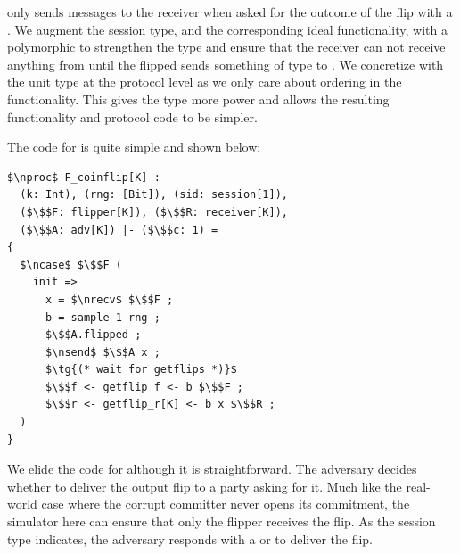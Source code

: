 \Fflip only sends messages to the receiver when asked for the outcome of the flip with a . 
We augment the session type, and the corresponding ideal functionality, with a polymorphic  to strengthen the type and ensure that the receiver can not receive anything from  until the flipped sends something of type  to \Fflip.
We concretize  with the unit type \inline{()} at the protocol level as we only care about ordering in the functionality. 
This gives the type more power and allows the resulting functionality and protocol code to be simpler. 

The code for \Fflip is quite simple and shown below:
\begin{lstlisting}[basicstyle=\footnotesize\BeraMonottFamily, frame=single, mathescape]
$\nproc$ F_coinflip[K] :
  (k: Int), (rng: [Bit]), (sid: session[1]),
  ($\$$F: flipper[K]), ($\$$R: receiver[K]),
  ($\$$A: adv[K]) |- ($\$$c: 1) =
{
  $\ncase$ $\$$F (
    init =>
      x = $\nrecv$ $\$$F ;
      b = sample 1 rng ;
      $\$$A.flipped ;
      $\nsend$ $\$$A x ;
	  $\tg{(* wait for getflips *)}$
      $\$$f <- getflip_f <- b $\$$F ;
      $\$$r <- getflip_r[K] <- b x $\$$R ;
  )
}
\end{lstlisting}
We elide the code for  although it is straightforward. 
The adversary decides whether to deliver the output flip to a party asking for it.
Much like the real-world case where the corrupt committer never opens its commitment, the simulator here can ensure that only the flipper receives the flip.
As the session type indicates, the adversary responds with a  or  to deliver the flip.


